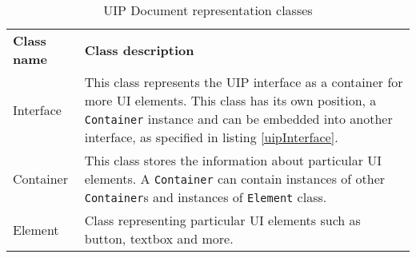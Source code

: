 \begin{table}[htbp]
  \centering
  \caption{UIP Document representation classes}
  \label{tab:uipDocClasses}
 \renewcommand{\arraystretch}{1.2}
    \begin{tabularx}{\textwidth}{p{3cm}|X}
    \rowcolor{mygray}
    \textbf{Class name} & \textbf{Class description} \\
      Interface & This class represents the UIP interface as a container for more UI elements. This class has its own position, a \texttt{Container} instance and can be embedded into another interface, as specified in listing \ref{uipInterface}. \\ \hline
       Container & This class stores the information about particular UI elements. A \texttt{Container} can contain instances of other \texttt{Container}s and instances of \texttt{Element} class.\\ \hline
       Element & Class representing particular UI elements such as button, textbox and more. \\
    \end{tabularx}%
    \label{tab:uipDocClasses2}
\end{table}%